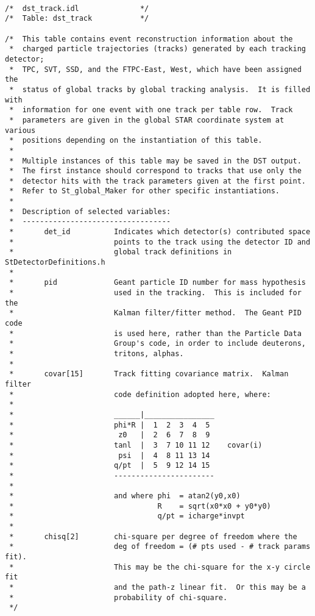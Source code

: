 \begin{verbatim}

/*  dst_track.idl              */
/*  Table: dst_track           */

/*  This table contains event reconstruction information about the
 *  charged particle trajectories (tracks) generated by each tracking detector;
 *  TPC, SVT, SSD, and the FTPC-East, West, which have been assigned the
 *  status of global tracks by global tracking analysis.  It is filled with 
 *  information for one event with one track per table row.  Track
 *  parameters are given in the global STAR coordinate system at various
 *  positions depending on the instantiation of this table.
 *
 *  Multiple instances of this table may be saved in the DST output.
 *  The first instance should correspond to tracks that use only the
 *  detector hits with the track parameters given at the first point.
 *  Refer to St_global_Maker for other specific instantiations.
 *  
 *  Description of selected variables:
 *  ----------------------------------
 *       det_id          Indicates which detector(s) contributed space
 *                       points to the track using the detector ID and
 *                       global track definitions in StDetectorDefinitions.h
 *
 *       pid             Geant particle ID number for mass hypothesis
 *                       used in the tracking.  This is included for the
 *                       Kalman filter/fitter method.  The Geant PID code
 *                       is used here, rather than the Particle Data
 *                       Group's code, in order to include deuterons,
 *                       tritons, alphas.
 *
 *       covar[15]       Track fitting covariance matrix.  Kalman filter
 *                       code definition adopted here, where:
 *
 *                       ______|________________
 *                       phi*R |  1  2  3  4  5
 *                        z0   |  2  6  7  8  9
 *                       tanl  |  3  7 10 11 12    covar(i)
 *                        psi  |  4  8 11 13 14
 *                       q/pt  |  5  9 12 14 15
 *                       -----------------------
 *
 *                       and where phi  = atan2(y0,x0)
 *                                 R    = sqrt(x0*x0 + y0*y0)
 *                                 q/pt = icharge*invpt
 *
 *       chisq[2]        chi-square per degree of freedom where the
 *                       deg of freedom = (# pts used - # track params fit).
 *                       This may be the chi-square for the x-y circle fit
 *                       and the path-z linear fit.  Or this may be a
 *                       probability of chi-square. 
 */


\end{verbatim}
